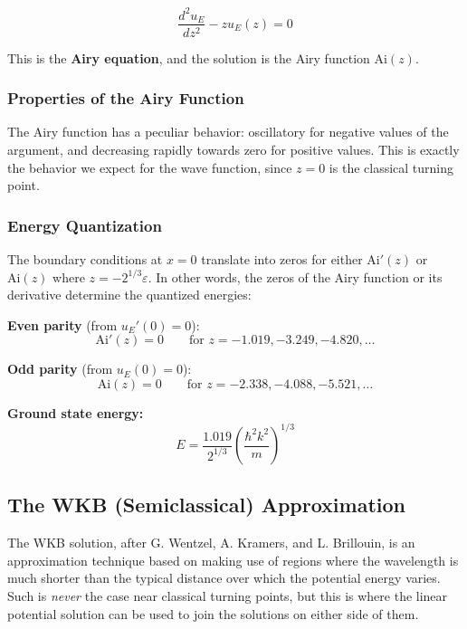 \documentclass[11pt,a4paper]{article}
\begin{document}
\begin{equation}
\boxed{\frac{d^2 u_E}{dz^2} - zu_E(z) = 0}
\tag{2.237}
\end{equation}

This is the \textbf{Airy equation}, and the solution is the Airy function $\text{Ai}(z)$.

\subsubsection{Properties of the Airy Function}

The Airy function has a peculiar behavior: oscillatory for negative values of the argument, and decreasing rapidly towards zero for positive values. This is exactly the behavior we expect for the wave function, since $z = 0$ is the classical turning point.

\subsubsection{Energy Quantization}

The boundary conditions at $x = 0$ translate into zeros for either $\text{Ai}'(z)$ or $\text{Ai}(z)$ where $z = -2^{1/3}\varepsilon$. In other words, the zeros of the Airy function or its derivative determine the quantized energies:

\textbf{Even parity} (from $u_E'(0) = 0$):
\begin{equation}
\text{Ai}'(z) = 0 \qquad \text{for } z = -1.019, -3.249, -4.820, \ldots
\tag{2.238}
\end{equation}

\textbf{Odd parity} (from $u_E(0) = 0$):
\begin{equation}
\text{Ai}(z) = 0 \qquad \text{for } z = -2.338, -4.088, -5.521, \ldots
\tag{2.239}
\end{equation}

\textbf{Ground state energy:}
\begin{equation}
\boxed{E = \frac{1.019}{2^{1/3}}\left(\frac{\hbar^2 k^2}{m}\right)^{1/3}}
\end{equation}

\subsection{The WKB (Semiclassical) Approximation}

The WKB solution, after G. Wentzel, A. Kramers, and L. Brillouin, is an approximation technique based on making use of regions where the wavelength is much shorter than the typical distance over which the potential energy varies. Such is \textit{never} the case near classical turning points, but this is where the linear potential solution can be used to join the solutions on either side of them.
\end{document}

